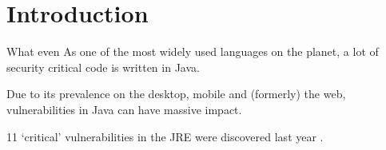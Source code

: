 \section{Introduction}

\begin{frame}{What even}
	As one of the most widely used languages on the planet, a lot of security critical code is written in Java.
	
	Due to its prevalence on the desktop, mobile and (formerly) the web, vulnerabilities in Java can have massive impact.
	
	11 `critical' vulnerabilities in the JRE were discovered last year \cite{nvd:jre2016cvss9}.
\end{frame}